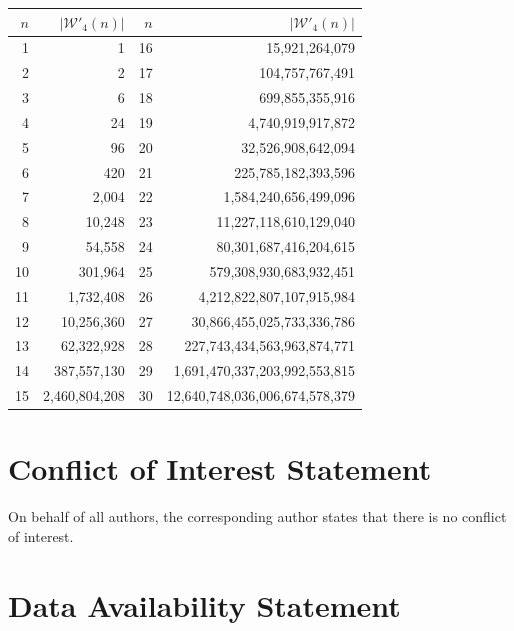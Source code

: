 \documentclass[12pt]{amsart}
\theoremstyle{definition}
\begin{document}
\begin{longtable}{rr|rr}
\toprule
$n$ & $|\mathcal{W}'_4(n)|$ & $n$ & $|\mathcal{W}'_4(n)|$ \\ \midrule
1 & 1 & 16 & 15,921,264,079 \\
2 & 2 & 17 & 104,757,767,491 \\
3 & 6 & 18 & 699,855,355,916 \\
4 & 24 & 19 & 4,740,919,917,872 \\
5 & 96 & 20 & 32,526,908,642,094 \\
6 & 420 & 21 & 225,785,182,393,596 \\
7 & 2,004 & 22 & 1,584,240,656,499,096 \\
8 & 10,248 & 23 & 11,227,118,610,129,040 \\
9 & 54,558 & 24 & 80,301,687,416,204,615 \\
10 & 301,964 & 25 & 579,308,930,683,932,451 \\
11 & 1,732,408 & 26 & 4,212,822,807,107,915,984 \\
12 & 10,256,360 & 27 & 30,866,455,025,733,336,786 \\
13 & 62,322,928 & 28 & 227,743,434,563,963,874,771 \\
14 & 387,557,130 & 29 & 1,691,470,337,203,992,553,815 \\
15 & 2,460,804,208 & 30 & 12,640,748,036,006,674,578,379 \\ \bottomrule
\end{longtable}
\section*{Conflict of Interest Statement}

On behalf of all authors, the corresponding author states that there is no conflict of interest.

\section*{Data Availability Statement}
\end{document}
